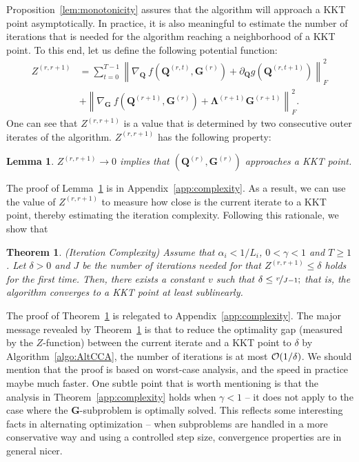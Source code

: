 \documentclass[10pt,journal]{IEEEtran}
\newtheorem{Lemma}{Lemma}
\newtheorem{Theorem}{Theorem}
\newcommand{\G}{\boldsymbol{G}}
\newcommand{\Q}{\boldsymbol{Q}}
\begin{document}
Proposition~\ref{lem:monotonicity} assures that the algorithm will approach a KKT point asymptotically.
In practice, it is also meaningful to estimate the number of iterations that is needed for the algorithm reaching a neighborhood of a KKT point.
To this end, let us define the following potential function:
\begin{equation}
\begin{aligned}
Z^{(r,r+1)} &=\sum_{t=0}^{T-1}\left\|\nabla_{\Q}~f\left(\Q^{(r,t)},\G^{(r)}\right) + \partial_{\Q} g\left(\Q^{(r,t+1)}\right)\right\|_F^2\\
                                                   &+ \left\| \nabla_{\G}~f\left(\Q^{(r+1)},\G^{(r)}\right) + {\bm \Lambda}^{(r+1)}\G^{(r+1)} \right\|_F^2.
\end{aligned}
\end{equation}
One can see that $Z^{(r,r+1)}$ is a value that is determined by two consecutive outer iterates of the algorithm.
$Z^{(r,r+1)}$ has the following property:
\begin{Lemma}\label{lem:z}
$Z^{(r,r+1)}\rightarrow 0$ implies that $(\Q^{(r)},\G^{(r)})$ approaches a KKT point.
\end{Lemma}
The proof of Lemma~\ref{lem:z} is in Appendix~\ref{app:complexity}.
As a result, we can use the value of $Z^{(r,r+1)}$
to measure how close is the current iterate to a KKT point, thereby estimating the iteration complexity.
Following this rationale, we show that

\begin{Theorem}\label{thm:complexity}
(Iteration Complexity) Assume that $\alpha_i<1/L_i$, $0<\gamma<1$ and $T\geq 1$.
Let $\delta> 0$ and $J$ be the number of iterations needed for that $Z^{(r,r+1)}\leq \delta$ holds for the first time.
Then, there exists a constant $v$ such that
$\delta \leq \nicefrac{v}{J-1};$
that is, the algorithm converges to a KKT point at least sublinearly.
\end{Theorem}
The proof of Theorem~\ref{thm:complexity} is relegated to Appendix~\ref{app:complexity}.
The major message revealed by Theorem~\ref{thm:complexity} is that to reduce the optimality gap (measured by the $Z$-function) between the current iterate and a KKT point to $\delta$ by Algorithm~\ref{algo:AltCCA}, the number of iterations is at most ${\cal O}(1/\delta)$. We should mention that the proof is based on worst-case analysis, and the speed in practice maybe much faster.
One subtle point that is worth mentioning is that the analysis in Theorem~\ref{app:complexity} holds when $\gamma<1$ -- it does not apply to the case where the ${\bm G}$-subproblem is optimally solved. This reflects some interesting facts in alternating optimization -- when subproblems are handled in a more conservative way and using a controlled step size, convergence properties are in general nicer. 
\end{document}
